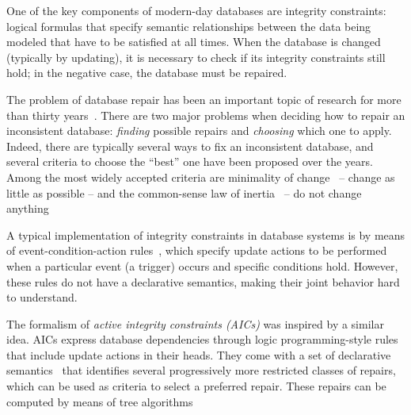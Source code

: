 One of the key components of modern-day databases are integrity constraints: logical formulas that specify semantic relationships between the data being modeled that have to be satisfied at all times.
When the database is changed (typically by updating), it is necessary to check if its integrity constraints still hold; in the negative case, the database must be repaired.

The problem of database repair has been an important topic of research for more than thirty years~\cite{icdt/Abiteboul88}.
There are two major problems when deciding how to repair an inconsistent database: \emph{finding} possible repairs and \emph{choosing} which one to apply.
Indeed, there are typically several ways to fix an inconsistent database, and several criteria to choose the ``best'' one have been proposed over the years.
Among the most widely accepted criteria are minimality of change~\cite{Winslett90,ai/EiterG92} -- change as little as possible -- and the common-sense law of inertia~\cite[discussed in, e.g.,][]{PrzymusinskiT97} -- do not change anything 

A typical implementation of integrity constraints in database systems is by means of event-condition-action rules~\cite{TenienteO95,WidomC96}, which specify update actions to be performed when a particular event (a trigger) occurs and specific conditions hold.
However, these rules do not have a declarative semantics, making their joint behavior hard to understand.

The formalism of \emph{active integrity constraints (AICs)} \cite{ppdp/FlescaGZ04} was inspired by a similar idea.
AICs express database dependencies through logic programming-style rules that include update actions in their heads.
They come with a set of declarative semantics~\cite{tplp/CaropreseT11} that identifies several progressively more restricted classes of repairs, which can be used as criteria to select a preferred repair.
These repairs can be computed by means of tree algorithms


